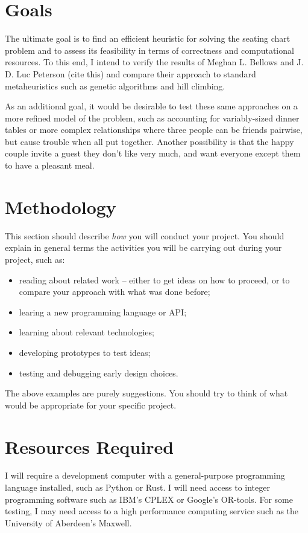 \documentclass[a4paper,12pt]{article}
\begin{document}
\section*{Goals}

The ultimate goal is to find an efficient heuristic for solving the seating
chart problem and to assess its feasibility in terms of correctness and
computational resources. To this end, I intend to verify the results of Meghan
L. Bellows and J. D. Luc Peterson (cite this) and compare their approach to
standard metaheuristics such as genetic algorithms and hill climbing.

As an additional goal, it would be desirable to test these same approaches on a
more refined model of the problem, such as accounting for  variably-sized dinner
tables or more complex relationships where three people can be friends pairwise,
but cause trouble when all put together. Another possibility is that the happy
couple invite a guest they don't like very much, and want everyone except them to
have a pleasant meal.

\section*{Methodology}

This section should describe {\em how} you will conduct
your project. You should explain in general terms
the activities you will be carrying out during your project, such as:
%
\begin{itemize}
\item reading about related work -- either to get ideas on how to
      proceed, or to compare your approach with what was done before;
\item learing a new programming language or API;
\item learning about relevant technologies;
\item developing prototypes to test ideas;
\item testing and debugging early design choices.
\end{itemize}
%
The above examples are purely suggestions. You should try to think
of what would be appropriate for your specific project.

\section*{Resources Required}

I will require a development computer with a general-purpose programming
language installed, such as Python or Rust. I will need access to integer
programming software such as IBM's CPLEX or Google's OR-tools. For some
testing, I may need access to a high performance computing service such
as the University of Aberdeen's Maxwell.
\end{document}
